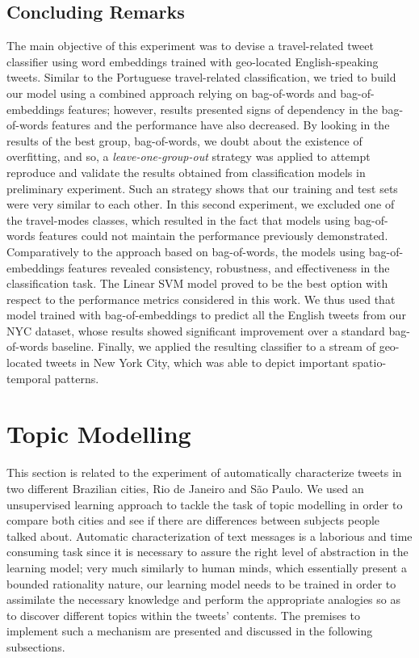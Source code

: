 \subsection{Concluding Remarks}
The main objective of this experiment was to devise a travel-related tweet classifier using word embeddings trained with geo-located English-speaking tweets. Similar to the Portuguese travel-related classification, we tried to build our model using a combined approach relying on bag-of-words and bag-of-embeddings features; however, results presented signs of dependency in the bag-of-words features and the performance have also decreased. By looking in the results of the best group, bag-of-words, we doubt about the existence of overfitting, and so, a \emph{leave-one-group-out} strategy was applied to attempt reproduce and validate the results obtained from classification models in preliminary experiment. Such an strategy shows that our training and test sets were very similar to each other. In this second experiment, we excluded one of the travel-modes classes, which resulted in the fact that models using bag-of-words features could not maintain the performance previously demonstrated. Comparatively to the approach based on bag-of-words, the models using bag-of-embeddings features revealed consistency, robustness, and effectiveness in the classification task. The Linear SVM model proved to be the best option with respect to the performance metrics considered in this work. We thus used that model trained with bag-of-embeddings to predict all the English tweets from our NYC dataset, whose results showed significant improvement over a standard bag-of-words baseline. Finally, we applied the resulting classifier to a stream of geo-located tweets in New York City, which was able to depict important spatio-temporal patterns.

\section{Topic Modelling}\label{sec:topic_modeling}
This section is related to the experiment of automatically characterize tweets in two different Brazilian cities, Rio de Janeiro and São Paulo. We used an unsupervised learning approach to tackle the task of topic modelling in order to compare both cities and see if there are differences between subjects people talked about. Automatic characterization of text messages is a laborious and time consuming task since it is necessary to assure the right level of abstraction in the learning model; very much similarly to human minds, which essentially present a bounded rationality nature, our learning model needs to be trained in order to assimilate the necessary knowledge and perform the appropriate analogies so as to discover different topics within the tweets' contents. The premises to implement such a mechanism are presented and discussed in the following subsections.

